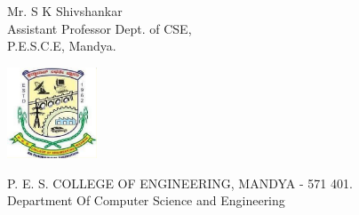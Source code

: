\begin{center}
    \fontsize{14}{20}\selectfont Mr. S K Shivshankar \\ \vspace{-0.25cm} Assistant Professor Dept. of CSE, \\  
    \vspace{-0.25cm}  P.E.S.C.E, Mandya.

    \vspace{0.5cm}

    \includegraphics[width=0.2\textwidth]{PES.png}

    \fontsize{14}{20}\selectfont P. E. S. COLLEGE OF ENGINEERING, MANDYA - 571 401. \\ \vspace{-0.4cm}Department Of Computer Science and Engineering

    
\end{center}
